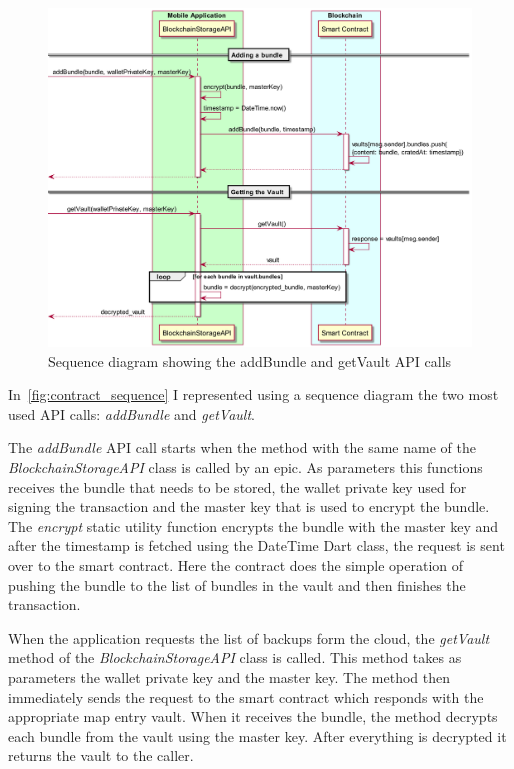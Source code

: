 \documentclass[a4paper,12pt]{report}
\begin{document}
\begin{figure}[H]
    \centering
    \includegraphics[scale=0.272]{diagrams/sequence/contract.png}
    \caption{Sequence diagram showing the addBundle and getVault API calls}\label{fig:contract_sequence}
\end{figure}

In~\autoref{fig:contract_sequence} I represented using a sequence diagram the
two most used API calls: \textit{addBundle} and \textit{getVault}.

The \textit{addBundle} API call starts when the method with the same name of
the \textit{BlockchainStorageAPI} class is called by an epic. As parameters
this functions receives the bundle that needs to be stored, the wallet private
key used for signing the transaction and the master key that is used to encrypt
the bundle. The \textit{encrypt} static utility function encrypts the bundle
with the master key and after the timestamp is fetched using the DateTime Dart
class, the request is sent over to the smart contract. Here the contract does
the simple operation of pushing the bundle to the list of bundles in the vault
and then finishes the transaction.

When the application requests the list of backups form the cloud, the
\textit{getVault} method of the \textit{BlockchainStorageAPI} class is called.
This method takes as parameters the wallet private key and the master key. The
method then immediately sends the request to the smart contract which responds
with the appropriate map entry vault. When it receives the bundle, the method
decrypts each bundle from the vault using the master key. After everything is
decrypted it returns the vault to the caller.
\end{document}
